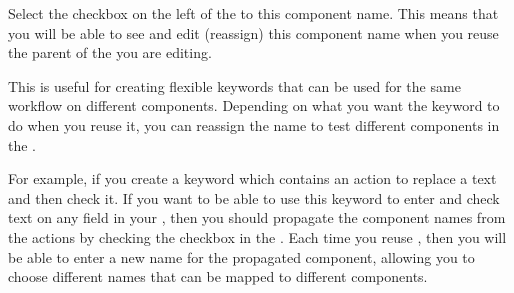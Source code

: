 Select the checkbox on the left of the \gdcompnamesview{} to  this component name. This means that you will be able to see and edit (reassign) this component name when you reuse the parent of the \gdcase{} you are editing. 

This is useful for creating flexible keywords that can be used for the same workflow on different components. Depending on what you want the keyword to do when you reuse it, you can reassign the name to test different components in the \gdaut{}. 

For example, if you create a keyword  which contains an action to replace a text and then check it. If you want to be able to use this keyword to enter and check text on any field in your \gdaut{}, then you should  propagate the component names from the actions by checking the checkbox in the \gdcompnamesview{}. Each time you reuse , then you will be able to enter a new name for the propagated component, allowing you to choose different names that can be mapped to different components. 
